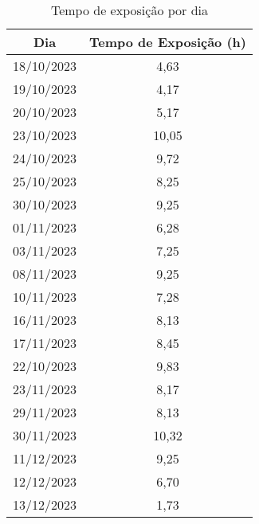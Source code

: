 \begin{table}[htp]
\centering
\caption{Tempo de exposição por dia}
\begin{tabular}{|c|c|}
\hline
\multicolumn{1}{|c|}{\textbf{Dia}} & \textbf{Tempo de Exposição (h)} \\ \hline
18/10/2023 & 4,63 \\
19/10/2023 & 4,17 \\
20/10/2023 & 5,17 \\
23/10/2023 & 10,05 \\
24/10/2023 & 9,72 \\
25/10/2023 & 8,25 \\
30/10/2023 & 9,25 \\
01/11/2023 & 6,28 \\
03/11/2023 & 7,25 \\
08/11/2023 & 9,25 \\
10/11/2023 & 7,28 \\
16/11/2023 & 8,13 \\
17/11/2023 & 8,45 \\
22/10/2023 & 9,83 \\
23/11/2023 & 8,17 \\
29/11/2023 & 8,13 \\
30/11/2023 & 10,32 \\
11/12/2023 & 9,25 \\
12/12/2023 & 6,70 \\
13/12/2023 & 1,73 \\ \hline
\end{tabular}
\label{tab:TempoDia}
\end{table}